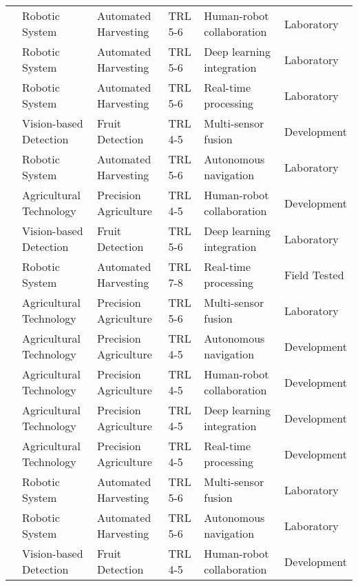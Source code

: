 \begin{table*}[htbp]
\begin{tabular}{@{}p{}p{}p{}p{}p{}p{}@{}}
\cite{agricultural_robot_2020} & Robotic System & Automated Harvesting & TRL 5-6 & Human-robot collaboration & Laboratory \\
\cite{pepper_robot_2017} & Robotic System & Automated Harvesting & TRL 5-6 & Deep learning integration & Laboratory \\
\cite{kiwi_harvesting_2020} & Robotic System & Automated Harvesting & TRL 5-6 & Real-time processing & Laboratory \\
\cite{pepper_robot_2017} & Vision-based Detection & Fruit Detection & TRL 4-5 & Multi-sensor fusion & Development \\
\cite{agricultural_robot_2020} & Robotic System & Automated Harvesting & TRL 5-6 & Autonomous navigation & Laboratory \\
\cite{apple_detection_2020} & Agricultural Technology & Precision Agriculture & TRL 4-5 & Human-robot collaboration & Development \\
\cite{agricultural_robot_2020} & Vision-based Detection & Fruit Detection & TRL 5-6 & Deep learning integration & Laboratory \\
\cite{pepper_robot_2017} & Robotic System & Automated Harvesting & TRL 7-8 & Real-time processing & Field Tested \\
\cite{harvesting_tech_2021} & Agricultural Technology & Precision Agriculture & TRL 5-6 & Multi-sensor fusion & Laboratory \\
\cite{agricultural_robotics_2020} & Agricultural Technology & Precision Agriculture & TRL 4-5 & Autonomous navigation & Development \\
\cite{agricultural_robotics_2020} & Agricultural Technology & Precision Agriculture & TRL 4-5 & Human-robot collaboration & Development \\
\cite{agricultural_robotics_2020} & Agricultural Technology & Precision Agriculture & TRL 4-5 & Deep learning integration & Development \\
\cite{agricultural_robotics_2020} & Agricultural Technology & Precision Agriculture & TRL 4-5 & Real-time processing & Development \\
\cite{tomato_harvest_2021} & Robotic System & Automated Harvesting & TRL 5-6 & Multi-sensor fusion & Laboratory \\
\cite{agricultural_robot_2020} & Robotic System & Automated Harvesting & TRL 5-6 & Autonomous navigation & Laboratory \\
\cite{agricultural_robotics_2020} & Vision-based Detection & Fruit Detection & TRL 4-5 & Human-robot collaboration & Development \\

\end{tabular}
\end{table*}
